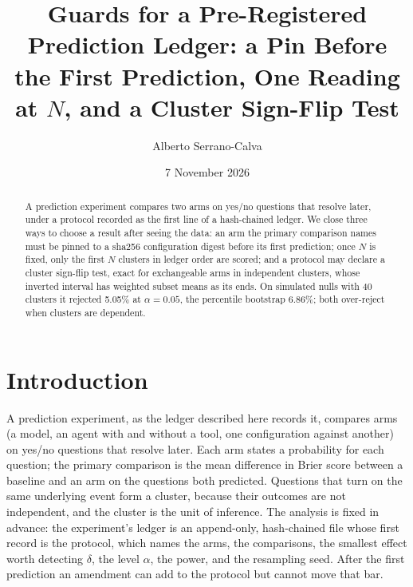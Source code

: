 \documentclass[11pt]{article}
\title{Guards for a Pre-Registered Prediction Ledger: a Pin Before the First Prediction, One
Reading at $N$, and a Cluster Sign-Flip Test}
\author{Alberto Serrano-Calva}
\date{7 November 2026}
\theoremstyle{plain}
\theoremstyle{definition}
\theoremstyle{remark}
\begin{document}
\maketitle

\begin{abstract}
A prediction experiment compares two arms on yes/no questions that resolve later, under a protocol
recorded as the first line of a hash-chained ledger. We close three ways to choose a result after
seeing the data: an arm the primary comparison names must be pinned to a sha256 configuration
digest before its first prediction; once $N$ is fixed, only the first $N$ clusters in ledger order
are scored; and a protocol may declare a cluster sign-flip test, exact for exchangeable arms in
independent clusters, whose inverted interval has weighted subset means as its ends. On simulated
nulls with 40 clusters it rejected 5.05\% at $\alpha = 0.05$, the percentile bootstrap 6.86\%; both
over-reject when clusters are dependent.
\end{abstract}

\section{Introduction}

A prediction experiment, as the ledger described here records it, compares arms (a model, an agent
with and without a tool, one configuration against another) on yes/no questions that resolve
later. Each arm states a probability for each question; the primary comparison is the mean
difference in Brier score between a baseline and an arm on the questions both predicted. Questions
that turn on the same underlying event form a cluster, because their outcomes are not independent,
and the cluster is the unit of inference. The analysis is fixed in advance: the experiment's
ledger is an append-only, hash-chained file whose first record is the protocol, which names the
arms, the comparisons, the smallest effect worth detecting $\delta$, the level $\alpha$, the power,
and the resampling seed. After the first prediction an amendment can add to the protocol but cannot
move that bar.
\end{document}
